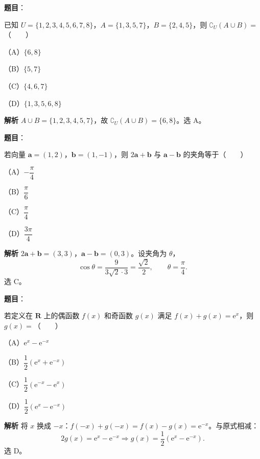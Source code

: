 
\begin{answer}

\textbf{题目}：

已知 $U=\{1,2,3,4,5,6,7,8\}$，$A=\{1,3,5,7\}$，$B=\{2,4,5\}$，则 $\complement_U(A\cup B)=$\mbox{（　　）}

（A）$\{6,8\}$

（B）$\{5,7\}$

（C）$\{4,6,7\}$

（D）$\{1,3,5,6,8\}$

\textbf{解析}
$A\cup B=\{1,2,3,4,5,7\}$，故 $\complement_U(A\cup B)=\{6,8\}$。选 A。


\end{answer}
\begin{answer}

\textbf{题目}：

若向量 $\boldsymbol a=(1,2)$，$\boldsymbol b=(1,-1)$，则 $2\boldsymbol a+\boldsymbol b$ 与 $\boldsymbol a-\boldsymbol b$ 的夹角等于\mbox{（　　）}

（A）$-\dfrac\pi4$

（B）$\dfrac\pi6$

（C）$\dfrac\pi4$

（D）$\dfrac{3\pi}4$

\textbf{解析}
$2\boldsymbol a+\boldsymbol b=(3,3)$，$\boldsymbol a-\boldsymbol b=(0,3)$。设夹角为 $\theta$，
\nopagebreak[4]
\[\cos\theta=\frac{9}{3\sqrt2\cdot3}=\frac{\sqrt2}2,\qquad\theta=\frac\pi4.\]
选 C。


\end{answer}
\begin{answer}

\textbf{题目}：

若定义在 $\mathbf R$ 上的偶函数 $f(x)$ 和奇函数 $g(x)$ 满足 $f(x)+g(x)=\mathrm e^x$，则 $g(x)=$\mbox{（　　）}

（A）$\mathrm e^x-\mathrm e^{-x}$

（B）$\dfrac12(\mathrm e^x+\mathrm e^{-x})$

（C）$\dfrac12(\mathrm e^{-x}-\mathrm e^x)$

（D）$\dfrac12(\mathrm e^x-\mathrm e^{-x})$

\textbf{解析}
将 $x$ 换成 $-x$：$f(-x)+g(-x)=f(x)-g(x)=\mathrm e^{-x}$。与原式相减：
\nopagebreak[4]
\[2g(x)=\mathrm e^x-\mathrm e^{-x}\Longrightarrow g(x)=\frac12(\mathrm e^x-\mathrm e^{-x}).\]
选 D。


\end{answer}
